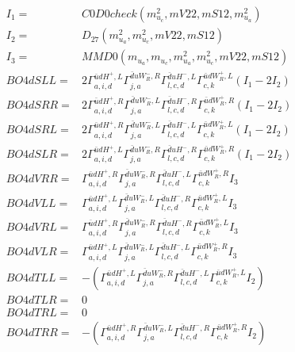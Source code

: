 \documentclass[A4,landscape]{article}
\begin{document}
\begin{align} 
I_1 = & C0D0check(m^2_{u_{{c}}}, mV22, mS12, m^2_{u_{{a}}}) \\ 
I_2 = & D_{27}(m^2_{u_{{a}}}, m^2_{u_{{c}}}, mV22, mS12) \\ 
I_3 = & MMD0(m_{u_{{a}}}, m_{u_{{c}}}, m^2_{u_{{a}}}, m^2_{u_{{c}}}, mV22, mS12) \\ 
  BO4dSLL= & 2  \Gamma^{\bar{u}d H^+,L}_{a, i, d} \Gamma^{\bar{d}u W_R^- ,R}_{j, a} \Gamma^{\bar{d}u H^- ,L}_{l, c, d} \Gamma^{\bar{u}d W_R^+,L}_{c, k} (I_1 - 2 I_2) \\ 
  BO4dSRR= & 2  \Gamma^{\bar{u}d H^+,R}_{a, i, d} \Gamma^{\bar{d}u W_R^- ,L}_{j, a} \Gamma^{\bar{d}u H^- ,R}_{l, c, d} \Gamma^{\bar{u}d W_R^+,R}_{c, k} (I_1 - 2 I_2) \\ 
  BO4dSRL= & 2  \Gamma^{\bar{u}d H^+,R}_{a, i, d} \Gamma^{\bar{d}u W_R^- ,L}_{j, a} \Gamma^{\bar{d}u H^- ,L}_{l, c, d} \Gamma^{\bar{u}d W_R^+,L}_{c, k} (I_1 - 2 I_2) \\ 
  BO4dSLR= & 2  \Gamma^{\bar{u}d H^+,L}_{a, i, d} \Gamma^{\bar{d}u W_R^- ,R}_{j, a} \Gamma^{\bar{d}u H^- ,R}_{l, c, d} \Gamma^{\bar{u}d W_R^+,R}_{c, k} (I_1 - 2 I_2) \\ 
  BO4dVRR= &  \Gamma^{\bar{u}d H^+,R}_{a, i, d} \Gamma^{\bar{d}u W_R^- ,R}_{j, a} \Gamma^{\bar{d}u H^- ,L}_{l, c, d} \Gamma^{\bar{u}d W_R^+,R}_{c, k} I_3 \\ 
  BO4dVLL= &  \Gamma^{\bar{u}d H^+,L}_{a, i, d} \Gamma^{\bar{d}u W_R^- ,L}_{j, a} \Gamma^{\bar{d}u H^- ,R}_{l, c, d} \Gamma^{\bar{u}d W_R^+,L}_{c, k} I_3 \\ 
  BO4dVRL= &  \Gamma^{\bar{u}d H^+,R}_{a, i, d} \Gamma^{\bar{d}u W_R^- ,R}_{j, a} \Gamma^{\bar{d}u H^- ,R}_{l, c, d} \Gamma^{\bar{u}d W_R^+,L}_{c, k} I_3 \\ 
  BO4dVLR= &  \Gamma^{\bar{u}d H^+,L}_{a, i, d} \Gamma^{\bar{d}u W_R^- ,L}_{j, a} \Gamma^{\bar{d}u H^- ,L}_{l, c, d} \Gamma^{\bar{u}d W_R^+,R}_{c, k} I_3 \\ 
  BO4dTLL= & -( \Gamma^{\bar{u}d H^+,L}_{a, i, d} \Gamma^{\bar{d}u W_R^- ,R}_{j, a} \Gamma^{\bar{d}u H^- ,L}_{l, c, d} \Gamma^{\bar{u}d W_R^+,L}_{c, k} I_2) \\ 
  BO4dTLR= & 0 \\ 
  BO4dTRL= & 0 \\ 
  BO4dTRR= & -( \Gamma^{\bar{u}d H^+,R}_{a, i, d} \Gamma^{\bar{d}u W_R^- ,L}_{j, a} \Gamma^{\bar{d}u H^- ,R}_{l, c, d} \Gamma^{\bar{u}d W_R^+,R}_{c, k} I_2) \\ 
\end{align} 
\end{document}
